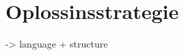 
\chapter{Oplossinsstrategie}
\label{chapter:oplossingsstrategie}

\TODO

\TODO \cite{matthys2012component} -> language + structure
